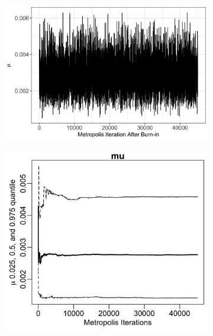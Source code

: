 \documentclass{uwstat572}
\begin{document}
\begin{figure}[H]
	\centering
	\begin{subfigure}[b]{\textwidth}
		\includegraphics[width=\textwidth]{figures/mu_mcmc_chain.png}
		\caption{}
	\label{fig:chain_mu}
	\end{subfigure}
	\qquad
	\begin{subfigure}[b]{0.49\textwidth}
		\includegraphics[width=\textwidth]{figures/mcmc_cum_quant_plot_mu.png}
		\caption{}
		\label{fig:quant_mu}
	\end{subfigure}
	\hfill
	\begin{subfigure}[b]{0.49\textwidth}

\end{subfigure}
\end{figure}
\end{document}
